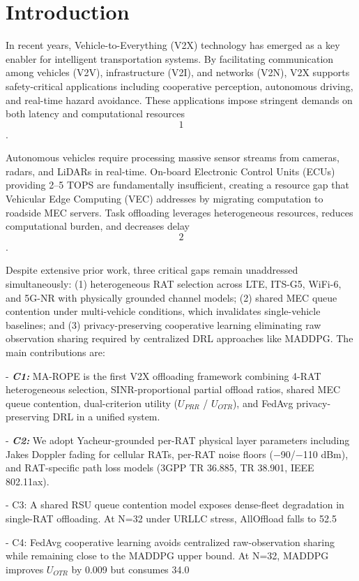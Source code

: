 \section{Introduction}
In recent years, Vehicle-to-Everything (V2X) technology has emerged as a key enabler for intelligent transportation systems. By facilitating communication among vehicles (V2V), infrastructure (V2I), and networks (V2N), V2X supports safety-critical applications including cooperative perception, autonomous driving, and real-time hazard avoidance. These applications impose stringent demands on both latency and computational resources \[1\].

Autonomous vehicles require processing massive sensor streams from cameras, radars, and LiDARs in real-time. On-board Electronic Control Units (ECUs) providing 2--5 TOPS are fundamentally insufficient, creating a resource gap that Vehicular Edge Computing (VEC) addresses by migrating computation to roadside MEC servers. Task offloading leverages heterogeneous resources, reduces computational burden, and decreases delay \[2\].

Despite extensive prior work, three critical gaps remain unaddressed simultaneously: (1) heterogeneous RAT selection across LTE, ITS-G5, WiFi-6, and 5G-NR with physically grounded channel models; (2) shared MEC queue contention under multi-vehicle conditions, which invalidates single-vehicle baselines; and (3) privacy-preserving cooperative learning eliminating raw observation sharing required by centralized DRL approaches like MADDPG. The main contributions are:

- \textbf{\textit{C1:}} MA-ROPE is the first V2X offloading framework combining   4-RAT heterogeneous selection, SINR-proportional partial offload   ratios, shared MEC queue contention, dual-criterion utility ($U_{PRR}$ /   $U_{OTR}$), and FedAvg privacy-preserving DRL in a unified system.

- \textbf{\textit{C2:}} We adopt Yacheur-grounded per-RAT physical layer parameters   including Jakes Doppler fading for cellular RATs, per-RAT noise floors   (−90/−110 dBm), and RAT-specific path loss models (3GPP TR 36.885, TR   38.901, IEEE 802.11ax).

- C3: A shared RSU queue contention model exposes dense-fleet   degradation in single-RAT offloading. At N=32 under URLLC stress,   AllOffload falls to 52.5%

- C4: FedAvg cooperative learning avoids centralized raw-observation   sharing while remaining close to the MADDPG upper bound. At N=32,   MADDPG improves $U_{OTR}$ by 0.009 but consumes 34.0%
